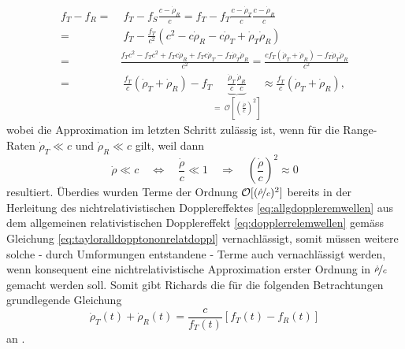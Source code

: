 \documentclass[a4paper,12pt]{article}
\numberwithin{equation}{section}
\begin{document}
\begin{align}
f_T-f_R =& \; f_T - f_S\frac{c-\dot{\rho}_R}{c} = f_T - f_T\frac{c-\dot{\rho}_T}{c}\frac{c-\dot{\rho}_R}{c} \\ =& \; f_T-\frac{f_T}{c^2}(c^2-c\dot{\rho}_R-c\dot{\rho}_T+\dot{\rho}_T\dot{\rho}_R) \\ =& \frac{f_Tc^2-f_Tc^2+f_Tc\dot{\rho}_R+f_Tc\dot{\rho}_T-f_T\dot{\rho}_T\dot{\rho}_R}{c^2} = \frac{cf_T(\dot{\rho}_T+\dot{\rho}_R)-f_T\dot{\rho}_T\dot{\rho}_R}{c^2} \\ =& \; \frac{f_T}{c}(\dot{\rho}_T+\dot{\rho}_R)-f_T\underbrace{\frac{\dot{\rho}_T}{c}\frac{\dot{\rho}_R}{c}}_{= \; \mathcal{O}[(\frac{\dot{\rho}}{c})^2]} \approx \frac{f_T}{c}(\dot{\rho}_T+\dot{\rho}_R),
\end{align} wobei die Approximation im letzten Schritt zulässig ist, wenn für die Range-Raten $\dot{\rho}_T \ll c$ und $\dot{\rho}_R \ll c$ gilt, weil dann \begin{equation}
\dot{\rho} \ll c \quad \Leftrightarrow \quad \frac{\dot{\rho}}{c} \ll 1 \quad \Rightarrow \quad \left(\frac{\dot{\rho}}{c}\right)^2 \approx 0
\end{equation} resultiert. Überdies wurden Terme der Ordnung $\mathcal{O}[(\nicefrac{\dot{\rho}}{c})^2]$ bereits in der Herleitung des nichtrelativistischen Dopplereffektes \eqref{eq:allgdoppleremwellen} aus dem allgemeinen relativistischen Dopplereffekt \eqref{eq:dopplerrelemwellen} gemäss Gleichung \eqref{eq:tayloralldopptononrelatdoppl} vernachlässigt, somit müssen weitere solche - durch Umformungen entstandene - Terme auch vernachlässigt werden, wenn konsequent eine nichtrelativistische Approximation erster Ordnung in $\nicefrac{\dot{\rho}}{c}$ gemacht werden soll. Somit gibt Richards die für die folgenden Betrachtungen grundlegende Gleichung \begin{equation}\label{centralformuladopplerrangerate}
\dot{\rho}_T(t) + \dot{\rho}_R(t) = \frac{c}{f_T(t)}[f_T(t) - f_R(t)]
\end{equation} an \cite[S.1729]{Richards.1961}.
\end{document}
